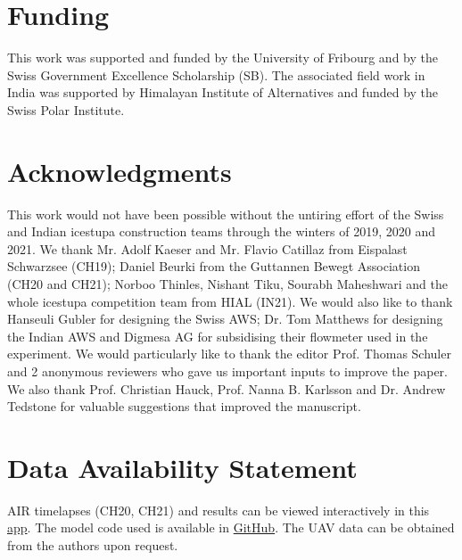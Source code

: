 \documentclass[utf8]{frontiersSCNS} %
\begin{document}
\section*{Funding} This work was supported and funded by the University of Fribourg and by the Swiss Government
Excellence Scholarship (SB). The associated field work in India was supported by Himalayan Institute of
Alternatives and funded by the Swiss Polar Institute.

\section*{Acknowledgments} This work would not have been possible without the untiring effort of the Swiss and
Indian icestupa construction teams through the winters of 2019, 2020 and 2021. We thank Mr. Adolf Kaeser and Mr.
Flavio Catillaz from Eispalast Schwarzsee (CH19); Daniel Beurki from the Guttannen Bewegt Association (CH20 and
CH21); Norboo Thinles, Nishant Tiku, Sourabh Maheshwari and the whole icestupa competition team from HIAL (IN21).
We would also like to thank Hanseuli Gubler for designing the Swiss AWS; Dr. Tom Matthews for designing the Indian AWS
and Digmesa AG for subsidising their flowmeter used in the experiment.  We would particularly like to thank the
editor Prof. Thomas Schuler and 2 anonymous reviewers who gave us important inputs to improve the paper. We also
thank Prof. Christian Hauck, Prof.  Nanna B. Karlsson and Dr.  Andrew Tedstone for valuable suggestions that
improved the manuscript.

\section*{Data Availability Statement} AIR timelapses (CH20, CH21) and results can be viewed interactively in this
\href{https://share.streamlit.io/gayashiva/air_model/src/visualization/webApp.py}{app}.  The model code used is
available in \href{https://github.com/Gayashiva/air_model}{GitHub}. The UAV data can be obtained from the authors
upon request.

 
\end{document}
